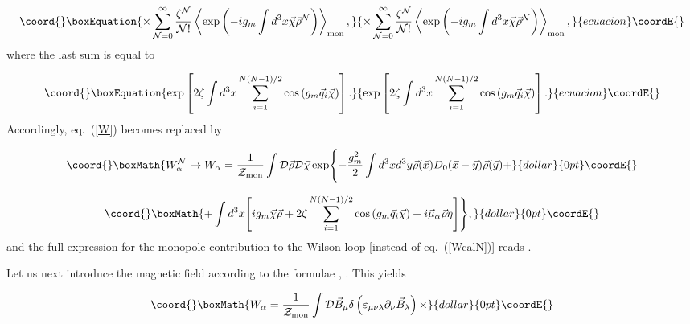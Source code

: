 \documentclass[a4paper,12pt]{article}
\begin{document}
\begin{equation}\coord{}\boxEquation{
\label{II}
\times\sum\limits_{{\cal N}=0}^{\infty}\frac{\zeta^{\cal N}}{{\cal N}!}
\left<\exp\left(-ig_m\int d^3x\vec\chi\vec\rho^{\cal N}\right)\right>_{\rm mon},
}{
\times\sum\limits_{{\cal N}=0}^{\infty}\frac{\zeta^{\cal N}}{{\cal N}!}
\left<\exp\left(-ig_m\int d^3x\vec\chi\vec\rho^{\cal N}\right)\right>_{\rm mon},
}{ecuacion}\coordE{}\end{equation}
where the last sum is equal to

\begin{equation}\coord{}\boxEquation{
\label{III}
\exp\left[2\zeta\int d^3x
\sum\limits_{i=1}^{N(N-1)/2}
\cos\left(g_m\vec q_i\vec\chi\right)\right].
}{
\exp\left[2\zeta\int d^3x
\sum\limits_{i=1}^{N(N-1)/2}
\cos\left(g_m\vec q_i\vec\chi\right)\right].
}{ecuacion}\coordE{}\end{equation}
Accordingly, eq.~(\ref{W}) becomes replaced by

$$\coord{}\boxMath{
W_\alpha^{\cal N}\to W_\alpha=\frac{1}{{\cal Z}_{\rm mon}}
\int{\cal D}\vec\rho{\cal D}\vec\chi\exp\Biggl\{-\frac{g_m^2}{2}\int d^3x d^3y\vec\rho(\vec x)D_0(\vec x-\vec y)
\vec\rho(\vec y)+}{dollar}{0pt}\coordE{}$$

$$\coord{}\boxMath{+\int d^3x\Biggl[ig_m\vec\chi\vec\rho+
2\zeta
\sum\limits_{i=1}^{N(N-1)/2}
\cos\left(g_m\vec q_i\vec\chi\right)+
i\vec\mu_\alpha\vec\rho\eta\Biggr]\Biggr\},}{dollar}{0pt}\coordE{}$$
and the full expression for the monopole contribution to the Wilson loop [instead of eq.~(\ref{WcalN})]
reads \coordHE{}.

Let us next introduce the magnetic field according to the formulae \coordHE{},
\coordHE{}. This yields

$$\coord{}\boxMath{
W_\alpha=\frac{1}{{\cal Z}_{\rm mon}}
\int{\cal D}\vec B_\mu\delta\left(\varepsilon_{\mu\nu\lambda}\partial_\nu\vec B_\lambda\right)\times}{dollar}{0pt}\coordE{}$$
\end{document}
